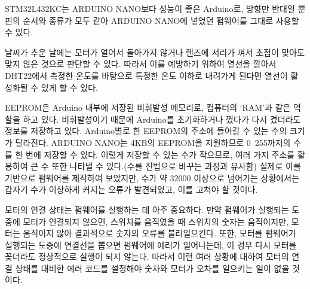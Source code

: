 \begin{description}[font=$\bullet$~\normalfont\scshape\color{red!50!black}]
	\item [MCU 변경] STM32L432KC는 ARDUINO NANO보다 성능이 좋은 Arduino로, 방향만 반대일 뿐 핀의 순서와 종류가 모두 같아 ARDUINO NANO에 넣었던 펌웨어를 그대로 사용할 수 있다.
	\item [Heating system 추가] 날씨가 추운 날에는 모터가 얼어서 돌아가지 않거나 렌즈에 서리가 껴서 초점이 맞아도 맞지 않은 것으로 판단할 수 있다. 따라서 이를 예방하기 위하여 열선을 깔아서 DHT22에서 측정한 온도를 바탕으로 특정한 온도 이하로 내려가게 된다면 열선이 활성화될 수 있게 할 수 있다.
	\item [EEPROM 활용] EEPROM은 Arduino 내부에 저장된 비휘발성 메모리로, 컴퓨터의 ‘RAM’과 같은 역할을 하고 있다. 비휘발성이기 때문에 Arduino를 초기화하거나 껐다가 다시 켰더라도 정보를 저장하고 있다. 
	Arduino별로 한 EEPROM의 주소에 들어갈 수 있는 수의 크기가 달라진다. ARDUINO NANO는 4KB의 EEPROM을 지원하므로 0~255까지의 수를 한 번에 저장할 수 있다. 이렇게 저장할 수 있는 수가 작으므로, 여러 가지 주소를 활용하여 큰 수 또한 나타낼 수 있다.(수를 진법으로 바꾸는 과정과 유사함) 실제로 이를 기반으로 펌웨어를 제작하여 보았지만, 수가 약 32000 이상으로 넘어가는 상황에서는 갑자기 수가 이상하게 커지는 오류가 발견되었고, 이를 고쳐야 할 것이다.
	\item [모터 연결 상태 체크 기능 추가] 모터의 연결 상태는 펌웨어를 실행하는 데 아주 중요하다. 만약 펌웨어가 실행되는 도중에 모터가 연결되지 않으면, 스위치를 움직였을 때 스위치의 숫자는 움직이지만, 모터는 움직이지 않아 결과적으로 숫자의 오류를 불러일으킨다. 또한, 모터를 펌웨어가 실행되는 도중에 연결선을 뽑으면 펌웨어에 에러가 일어나는데, 이 경우 다시 모터를 꽂더라도 정상적으로 실행이 되지 않는다. 따라서 이런 여러 상황에 대하여 모터의 연결 상태를 대비한 에러 코드를 설정해야 숫자와 모터가 오차를 일으키는 일이 없을 것이다.
\end{description}
